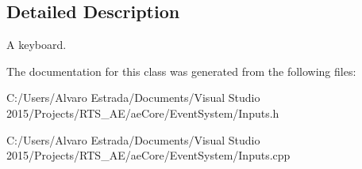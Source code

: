 \subsection{Detailed Description}
A keyboard. 

The documentation for this class was generated from the following files\+:\begin{DoxyCompactItemize}
\item 
C\+:/\+Users/\+Alvaro Estrada/\+Documents/\+Visual Studio 2015/\+Projects/\+R\+T\+S\+\_\+\+A\+E/ae\+Core/\+Event\+System/Inputs.\+h\item 
C\+:/\+Users/\+Alvaro Estrada/\+Documents/\+Visual Studio 2015/\+Projects/\+R\+T\+S\+\_\+\+A\+E/ae\+Core/\+Event\+System/Inputs.\+cpp\end{DoxyCompactItemize}
